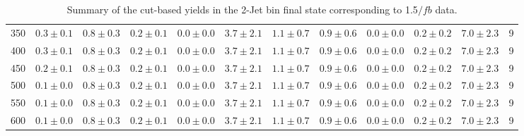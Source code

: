 \begin{table}
{\begin{center}
\begin{tabular}{l c c c c c c c c c c c }
350 & $0.3\pm0.1$ & $0.8\pm0.3$ & $0.2\pm0.1$ & $0.0\pm0.0$ & $3.7\pm2.1$ & $1.1\pm0.7$ & $0.9\pm0.6$ & $0.0\pm0.0$ & $0.2\pm0.2$ & $7.0\pm2.3$ & 9 \\
400 & $0.3\pm0.1$ & $0.8\pm0.3$ & $0.2\pm0.1$ & $0.0\pm0.0$ & $3.7\pm2.1$ & $1.1\pm0.7$ & $0.9\pm0.6$ & $0.0\pm0.0$ & $0.2\pm0.2$ & $7.0\pm2.3$ & 9 \\
450 & $0.2\pm0.1$ & $0.8\pm0.3$ & $0.2\pm0.1$ & $0.0\pm0.0$ & $3.7\pm2.1$ & $1.1\pm0.7$ & $0.9\pm0.6$ & $0.0\pm0.0$ & $0.2\pm0.2$ & $7.0\pm2.3$ & 9 \\
500 & $0.1\pm0.0$ & $0.8\pm0.3$ & $0.2\pm0.1$ & $0.0\pm0.0$ & $3.7\pm2.1$ & $1.1\pm0.7$ & $0.9\pm0.6$ & $0.0\pm0.0$ & $0.2\pm0.2$ & $7.0\pm2.3$ & 9 \\
550 & $0.1\pm0.0$ & $0.8\pm0.3$ & $0.2\pm0.1$ & $0.0\pm0.0$ & $3.7\pm2.1$ & $1.1\pm0.7$ & $0.9\pm0.6$ & $0.0\pm0.0$ & $0.2\pm0.2$ & $7.0\pm2.3$ & 9 \\
600 & $0.1\pm0.0$ & $0.8\pm0.3$ & $0.2\pm0.1$ & $0.0\pm0.0$ & $3.7\pm2.1$ & $1.1\pm0.7$ & $0.9\pm0.6$ & $0.0\pm0.0$ & $0.2\pm0.2$ & $7.0\pm2.3$ & 9 \\
\hline
\end{tabular}
\end{center}
}
\caption{Summary of the cut-based yields in the 2-Jet bin final state corresponding to 1.5$/fb$ data.}
\end{table}
